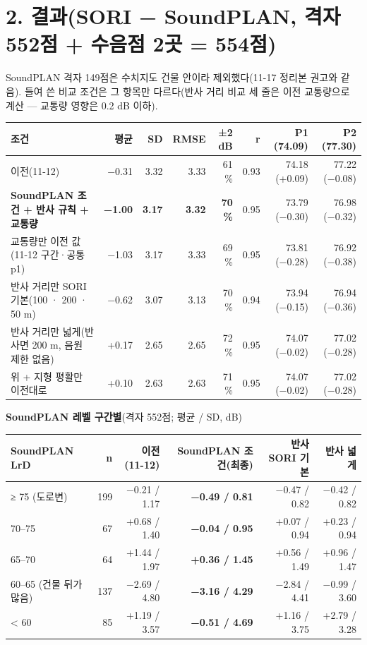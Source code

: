 \documentclass[10pt,a4paper]{article}
\newcommand{\hl}[1]{\textbf{#1}}
\begin{document}
\section*{2. 결과(SORI − SoundPLAN, 격자 552점 + 수음점 2곳 = 554점)}
SoundPLAN 격자 149점은 수치지도 건물 안이라 제외했다(11-17 정리본 권고와 같음).
들여 쓴 비교 조건은 그 항목만 다르다(반사 거리 비교 세 줄은 이전 교통량으로 계산 — 교통량 영향은 0.2 dB 이하).

{\small
\begin{tabularx}{\linewidth}{@{}Lrrrrrrr@{}}
\toprule
조건 & 평균 & SD & RMSE & ±2 dB & r & P1 (74.09) & P2 (77.30) \\
\midrule
이전(11-12) & −0.31 & 3.32 & 3.33 & 61 \% & 0.93 & 74.18 (+0.09) & 77.22 (−0.08) \\
\hl{SoundPLAN 조건 + 반사 규칙 + 교통량} & \hl{−1.00} & \hl{3.17} & \hl{3.32} & \hl{70 \%} & 0.95 & 73.79 (−0.30) & 76.98 (−0.32) \\
\quad 교통량만 이전 값(11-12 구간·공통 p1) & −1.03 & 3.17 & 3.33 & 69 \% & 0.95 & 73.81 (−0.28) & 76.92 (−0.38) \\
\quad 반사 거리만 SORI 기본(100 · 200 · 50 m) & −0.62 & 3.07 & 3.13 & 70 \% & 0.94 & 73.94 (−0.15) & 76.94 (−0.36) \\
\quad 반사 거리만 넓게(반사면 200 m, 음원 제한 없음) & +0.17 & 2.65 & 2.65 & 72 \% & 0.95 & 74.07 (−0.02) & 77.02 (−0.28) \\
\quad 위 + 지형 평활만 이전대로 & +0.10 & 2.63 & 2.63 & 71 \% & 0.95 & 74.07 (−0.02) & 77.02 (−0.28) \\
\bottomrule
\end{tabularx}}

\textbf{SoundPLAN 레벨 구간별}(격자 552점; 평균 / SD, dB)

{\small
\begin{tabularx}{\linewidth}{@{}lrRRRR@{}}
\toprule
SoundPLAN LrD & n & 이전(11-12) & \hl{SoundPLAN 조건(최종)} & 반사 SORI 기본 & 반사 넓게 \\
\midrule
≥ 75 (도로변) & 199 & −0.21 / 1.17 & \hl{−0.49 / 0.81} & −0.47 / 0.82 & −0.42 / 0.82 \\
70–75 & 67 & +0.68 / 1.40 & \hl{−0.04 / 0.95} & +0.07 / 0.94 & +0.23 / 0.94 \\
65–70 & 64 & +1.44 / 1.97 & \hl{+0.36 / 1.45} & +0.56 / 1.49 & +0.96 / 1.47 \\
60–65 (건물 뒤가 많음) & 137 & −2.69 / 4.80 & \hl{−3.16 / 4.29} & −2.84 / 4.41 & −0.99 / 3.60 \\
< 60 & 85 & +1.19 / 3.57 & \hl{−0.51 / 4.69} & +1.16 / 3.75 & +2.79 / 3.28 \\
\bottomrule
\end{tabularx}}
\end{document}
